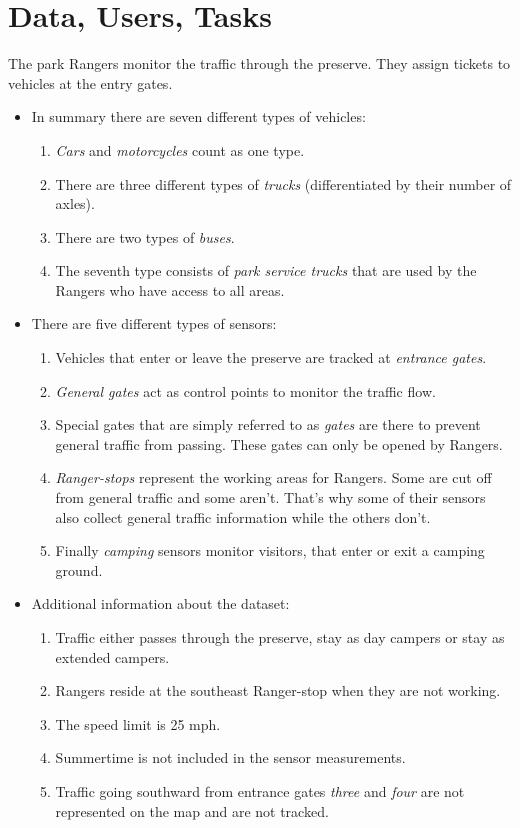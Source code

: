 \documentclass{article}
\begin{document}
\section{Data, Users, Tasks}
The park Rangers monitor the traffic through the preserve. They assign tickets to vehicles at the entry gates.
\begin{itemize}

\item In summary there are seven different types of vehicles:

	\begin{enumerate}
	\item \textit{Cars} and \textit{motorcycles} count as one type.
	\item There are three different types of \textit{trucks} (differentiated by their number of axles).
	\item There are two types of \textit{buses}.
	\item The seventh type consists of \textit{park service trucks} that are used by the Rangers who have access to all areas.
	\end{enumerate}

\item There are five different types of sensors:

	\begin{enumerate}
	\item Vehicles that enter or leave the preserve are tracked at \textit{entrance gates}.
	\item \textit{General gates} act as control points to monitor the traffic flow.
	\item Special gates that are simply referred to as \textit{gates} are there to prevent general traffic from passing. These gates can only be opened by Rangers.
	\item \textit{Ranger-stops} represent the working areas for Rangers. Some are cut off from general traffic and some aren't. That's why some of their sensors also collect general traffic information while the others don't.
	\item Finally \textit{camping} sensors monitor visitors, that enter or exit a camping ground.
	\end{enumerate}

\item Additional information about the dataset:

	\begin{enumerate}		
	\item Traffic either passes through the preserve, stay as day campers or stay as extended campers.
	\item Rangers reside at the southeast Ranger-stop when they are not working.
	\item The speed limit is 25 mph.
	\item Summertime is not included in the sensor measurements.
	\item Traffic going southward from entrance gates \textit{three} and \textit{four} are not represented on the map and are not tracked.
	\end{enumerate}


\end{itemize}
\end{document}
